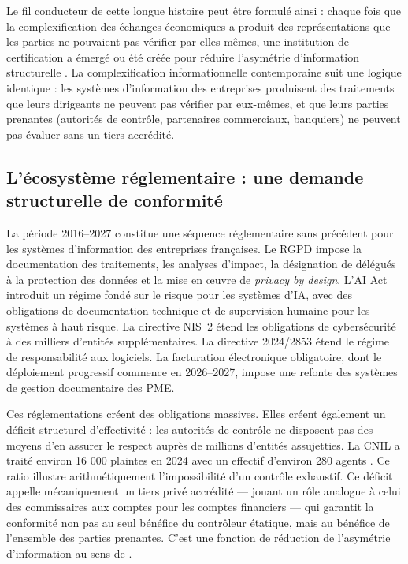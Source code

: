 \documentclass[12pt,a4paper]{article}
\begin{document}
Le fil conducteur de cette longue histoire peut être formulé ainsi : chaque fois que la complexification des échanges économiques a produit des représentations que les parties ne pouvaient pas vérifier par elles-mêmes, une institution de certification a émergé ou été créée pour réduire l'asymétrie d'information structurelle \parencite{akerlof1970}. La complexification informationnelle contemporaine suit une logique identique : les systèmes d'information des entreprises produisent des traitements que leurs dirigeants ne peuvent pas vérifier par eux-mêmes, et que leurs parties prenantes (autorités de contrôle, partenaires commerciaux, banquiers) ne peuvent pas évaluer sans un tiers accrédité.

\subsection{L'écosystème réglementaire : une demande structurelle de conformité}

La période 2016--2027 constitue une séquence réglementaire sans précédent pour les systèmes d'information des entreprises françaises. Le RGPD \parencite{rgpd2016} impose la documentation des traitements, les analyses d'impact, la désignation de délégués à la protection des données et la mise en œuvre de \emph{privacy by design}. L'AI Act \parencite{aiact2024} introduit un régime fondé sur le risque pour les systèmes d'IA, avec des obligations de documentation technique et de supervision humaine pour les systèmes à haut risque. La directive NIS~2 \parencite{nis22022} étend les obligations de cybersécurité à des milliers d'entités supplémentaires. La directive 2024/2853 \parencite{directive20242853} étend le régime de responsabilité aux logiciels. La facturation électronique obligatoire, dont le déploiement progressif commence en 2026--2027, impose une refonte des systèmes de gestion documentaire des PME.

Ces réglementations créent des obligations massives. Elles créent également un déficit structurel d'effectivité : les autorités de contrôle ne disposent pas des moyens d'en assurer le respect auprès de millions d'entités assujetties. La CNIL a traité environ 16 000 plaintes en 2024 avec un effectif d'environ 280 agents \parencite{cnil2024}. Ce ratio illustre arithmétiquement l'impossibilité d'un contrôle exhaustif. Ce déficit appelle mécaniquement un tiers privé accrédité — jouant un rôle analogue à celui des commissaires aux comptes pour les comptes financiers — qui garantit la conformité non pas au seul bénéfice du contrôleur étatique, mais au bénéfice de l'ensemble des parties prenantes. C'est une fonction de réduction de l'asymétrie d'information au sens de \textcite{williamson1985}.
\end{document}
